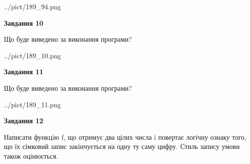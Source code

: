 \documentclass[12pt, ukrainian]{article}
\begin{document}
{\begin {large}
\begin{center}
	{../pict/189_94.png}
\end{center}
\newpage

{\begin {center}\textbf{Завдання 10}\end {center}}

Що буде виведено за виконання програми?\par
\begin{center}
	{../pict/189_10.png}
\end{center}
\newpage

{\begin {center}\textbf{Завдання 11}\end {center}}

Що буде виведено за виконання програми?\par
\begin{center}
	{../pict/189_11.png}
\end{center}
\newpage

{\begin {center}\textbf{Завдання 12}\end {center}}


Написати функцiю f, що отримує два цілих числа i повертає логічну ознаку того, що їх сімковий запис закінчується на одну ту саму цифру. Стиль запису умови також оцінюється.\par
\newpage

\end {large}}
\end{document}
